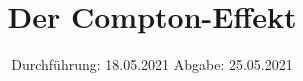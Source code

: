 

\subject{603}
\title{Der Compton-Effekt}
\date{%
  Durchführung: 18.05.2021
  \hspace{3em}
  Abgabe: 25.05.2021
}



\maketitle
\thispagestyle{empty}
\tableofcontents
\newpage







\printbibliography{}



